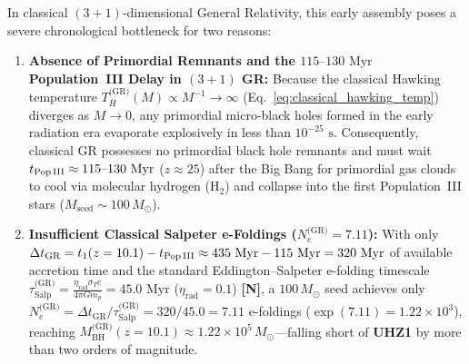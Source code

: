 \documentclass[11pt,a4paper]{article}
\newcommand{\catN}{\textbf{\textcolor{teal!75!black}{[N]}}}
\theoremstyle{plain}
\theoremstyle{definition}
\theoremstyle{remark}
\numberwithin{equation}{section}
\begin{document}
In classical $(3+1)$-dimensional General Relativity, this early assembly poses a severe chronological bottleneck for two reasons:
\begin{enumerate}
  \item \textbf{Absence of Primordial Remnants and the $115\text{--}130\text{ Myr}$ Population~III Delay in $(3+1)$ GR:} Because the classical Hawking temperature $T_H^{\text{(GR)}}(M) \propto M^{-1} \to \infty$ (Eq.~\ref{eq:classical_hawking_temp}) diverges as $M \to 0$, any primordial micro-black holes formed in the early radiation era evaporate explosively in less than $10^{-25}\text{ s}$. Consequently, classical GR possesses no primordial black hole remnants and must wait $t_{\text{Pop\,III}} \approx 115\text{--}130\text{ Myr}$ ($z \approx 25$) after the Big Bang for primordial gas clouds to cool via molecular hydrogen ($\text{H}_2$) and collapse into the first Population~III stars ($M_{\text{seed}} \sim 100\,M_\odot$).
  \item \textbf{Insufficient Classical Salpeter e-Foldings ($N_e^{\text{(GR)}} = 7.11$):} With only $\Delta t_{\text{GR}} = t_1(z=10.1) - t_{\text{Pop\,III}} \approx 435\text{ Myr} - 115\text{ Myr} = 320\text{ Myr}$ of available accretion time and the standard Eddington--Salpeter e-folding timescale $\tau_{\text{Salp}}^{\text{(GR)}} = \frac{\eta_{\text{rad}} \sigma_T c}{4\pi G m_p} = 45.0\text{ Myr}$ ($\eta_{\text{rad}} = 0.1$) \catN, a $100\,M_\odot$ seed achieves only $N_e^{\text{(GR)}} = \Delta t_{\text{GR}} / \tau_{\text{Salp}}^{\text{(GR)}} = 320 / 45.0 = 7.11$ e-foldings ($\exp(7.11) = 1.22 \times 10^3$), reaching $M_{\text{BH}}^{\text{(GR)}}(z=10.1) \approx 1.22 \times 10^5\,M_\odot$---falling short of \textbf{UHZ1} by more than two orders of magnitude.
\end{enumerate}
\end{document}

